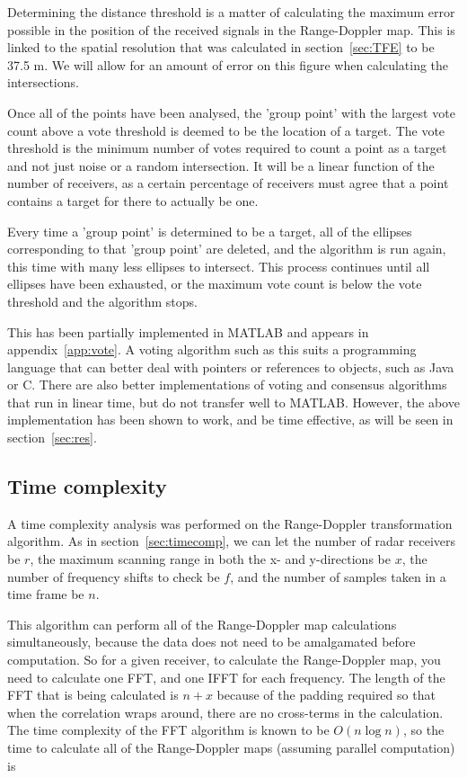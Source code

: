 \documentclass[12pt,openany,a4paper]{book}
\begin{document}
Determining the distance threshold is a matter of calculating the maximum error possible in the position of the received signals in the Range-Doppler map. This is linked to the spatial resolution that was calculated in section~\ref{sec:TFE} to be 37.5 m. We will allow for an amount of error on this figure when calculating the intersections. 

\bigskip

Once all of the points have been analysed, the 'group point' with the largest vote count above a vote threshold is deemed to be the location of a target. The vote threshold is the minimum number of votes required to count a point as a target and not just noise or a random intersection. It will be a linear function of the number of receivers, as a certain percentage of receivers must agree that a point contains a target for there to actually be one.

\bigskip

Every time a 'group point' is determined to be a target, all of the ellipses corresponding to that 'group point' are deleted, and the algorithm is run again, this time with many less ellipses to intersect. This process continues until all ellipses have been exhausted, or the maximum vote count is below the vote threshold and the algorithm stops.

\bigskip

This has been partially implemented in MATLAB and appears in appendix~\ref{app:vote}. A voting algorithm such as this suits a programming language that can better deal with pointers or references to objects, such as Java or C. There are also better implementations of voting and consensus algorithms\cite{vote1,vote2,vote3} that run in linear time, but do not transfer well to MATLAB. However, the above implementation has been shown to work, and be time effective, as will be seen in section~\ref{sec:res}.


\subsection{Time complexity}
A time complexity analysis was performed on the Range-Doppler transformation algorithm. As in section~\ref{sec:timecomp}, we can let the number of radar receivers be $r$, the maximum scanning range in both the x- and y-directions be $x$, the number of frequency shifts to check be $f$, and the number of samples taken in a time frame be $n$.

\bigskip

This algorithm can perform all of the Range-Doppler map calculations simultaneously, because the data does not need to be amalgamated before computation. So for a given receiver, to calculate the Range-Doppler map, you need to calculate one FFT, and one IFFT for each frequency. The length of the FFT that is being calculated is $n+x$ because of the padding required so that when the correlation wraps around, there are no cross-terms in the calculation. The time complexity of the FFT algorithm is known to be $O(n\log n)$, so the time to calculate all of the Range-Doppler maps (assuming parallel computation) is
\end{document}

